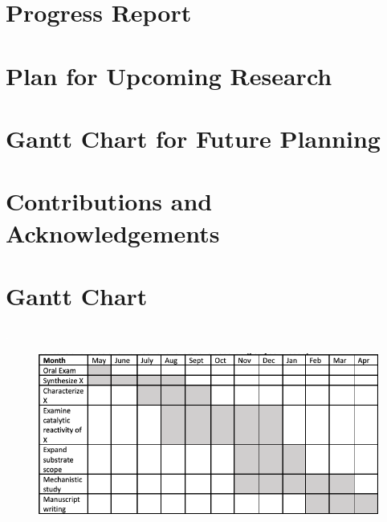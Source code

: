 \documentclass{report}
\begin{document}
\section{Progress Report}
\label{sec:progress_report}


\section{Plan for Upcoming Research}
\label{sec:plan_upcoming}


\section{Gantt Chart for Future Planning}
\label{sec:gantt_chart_text}


\section{Contributions and Acknowledgements}
\label{sec:contribution_acknowledgements}


\newpage
\section{Gantt Chart}
\label{sec:gantt}

\textcolor{white}{.}

\begin{figure}[H]
    \centering
    \includegraphics[width=\textwidth]{figures/gantt_chart.png}
    \label{fig:gantt_chart}
\end{figure}

\newpage
\printbibliography
\end{document}
